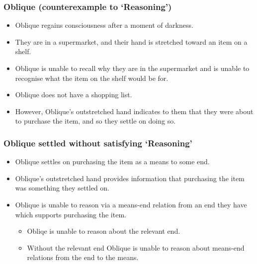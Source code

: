 \documentclass[noamssymb, compress, handout]{beamer} %
\begin{document}
\begin{frame}
  \frametitle{Oblique (counterexample to `Reasoning')}

  {\rmfamily
    \begin{itemize}
      \item Oblique regains consciousness after a moment of darkness.%
      \item They are in a supermarket, and their hand is stretched toward an item on a shelf.%
      \item Oblique is unable to recall why they are in the supermarket and is unable to recognise what the item on the shelf would be for.%
      \item Oblique does not have a shopping list.%
      \item However, Oblique's outstretched hand indicates to them that they were about to purchase the item, and so they settle on doing so.
      \end{itemize}
  }
\end{frame}

\begin{frame}
  \frametitle{Oblique settled without satisfying `Reasoning'}

  \begin{itemize}
  \item Oblique settles on purchasing the item as a means to some end.
  \item Oblique's outstretched hand provides information that purchasing the item was something they settled on.
  \item Oblique is unable to reason via a means-end relation from an end they have which supports purchasing the item.
    \begin{itemize}
    \item Obliqe is unable to reason about the relevant end.
    \item Without the relevant end Oblique is unable to reason about means-end relations from the end to the means.
    \end{itemize}
  \end{itemize}

\end{frame}
\end{document}
